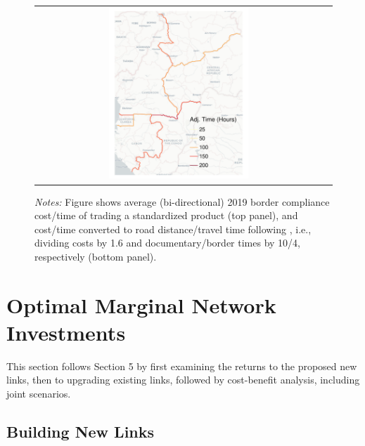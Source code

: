 \documentclass[a4paper]{article}
\begin{document}
\begin{figure}[H]
{\begin{tabular}{cc}
\includegraphics[width=0.5\textwidth, trim= {1cm 0 1cm 0}, clip]{"../figures/trade_costs/DBS_border_time_hours_adj_map.pdf"} \\ [-0.3em] 
\end{tabular}
} 
\raggedright
\scriptsize 
\emph{Notes:} Figure shows average (bi-directional) 2019 border compliance cost/time of trading a standardized product (top panel), and cost/time converted to road distance/travel time following \citet{krantz2024optimal}, i.e., dividing costs by 1.6 and documentary/border times by 10/4, respectively (bottom panel). \vspace{-5mm}
\end{figure}

\newpage
  
  
\section{Optimal Marginal Network Investments}

This section follows \citet{krantz2024optimal} Section 5 by first examining the returns to the proposed new links, then to upgrading existing links, followed by cost-benefit analysis, including joint scenarios. %

\subsection{Building New Links}
\end{document}

